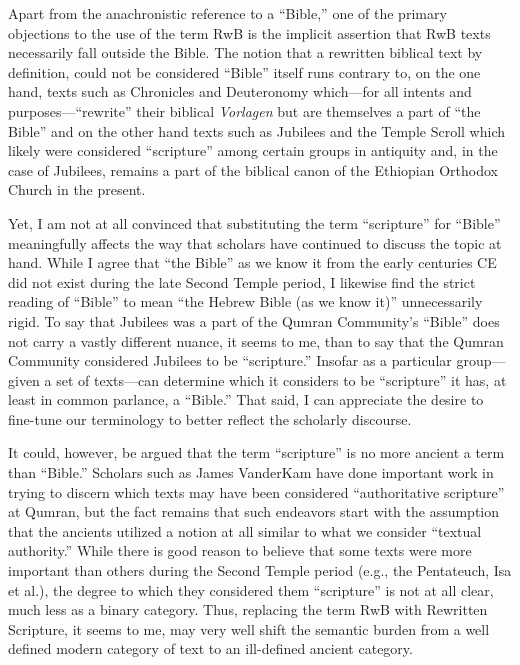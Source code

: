 Apart from the anachronistic reference to a ``Bible,'' one of the
primary objections to the use of the term RwB is the implicit assertion
that RwB texts necessarily fall outside the
Bible.\autocite[61]{campbell_zsengeller2014} The notion that a rewritten
biblical text by definition, could not be considered ``Bible'' itself
runs contrary to, on the one hand, texts such as Chronicles and
Deuteronomy which---for all intents and purposes---``rewrite'' their
biblical \emph{Vorlagen} but are themselves a part of ``the Bible'' and
on the other hand texts such as Jubilees and the Temple Scroll which
likely were considered ``scripture'' among certain groups in antiquity
and, in the case of Jubilees, remains a part of the biblical canon of
the Ethiopian Orthodox Church in the present.

Yet, I am not at all convinced that substituting the term ``scripture''
for ``Bible'' meaningfully affects the way that scholars have continued
to discuss the topic at hand. While I agree that ``the Bible'' as we
know it from the early centuries CE did not exist during the late
Second Temple period, I likewise find the strict reading of ``Bible'' to
mean ``the Hebrew Bible (as we know it)'' unnecessarily rigid. To say
that Jubilees was a part of the Qumran Community's ``Bible'' does not
carry a vastly different nuance, it seems to me, than to say that the
Qumran Community considered Jubilees to be ``scripture.'' Insofar as a
particular group---given a set of texts---can determine which it
considers to be ``scripture'' it has, at least in common parlance, a
``Bible.'' That said, I can appreciate the desire to fine-tune our
terminology to better reflect the scholarly discourse.

It could, however, be argued that the term ``scripture'' is no more
ancient a term than ``Bible.'' Scholars such as James VanderKam have
done important work in trying to discern which texts may have been
considered ``authoritative scripture'' at
Qumran,\autocite{vanderkam_dsd1998} but the fact remains that such
endeavors start with the assumption that the ancients utilized a notion
at all similar to what we consider ``textual authority.'' While there is
good reason to believe that some texts were more important than others
during the Second Temple period (e.g., the Pentateuch, Isa et al.), the
degree to which they considered them ``scripture'' is not at all clear,
much less as a binary category. Thus, replacing the term RwB with
Rewritten Scripture, it seems to me, may very well shift the semantic
burden from a well defined modern category of text to an ill-defined
ancient category.

